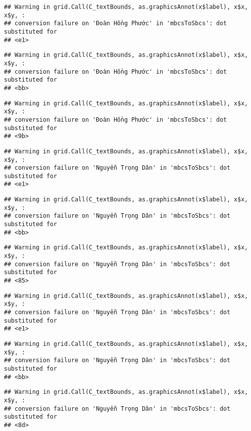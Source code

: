 \documentclass[
]{article}
\begin{document}
\begin{verbatim}
## Warning in grid.Call(C_textBounds, as.graphicsAnnot(x$label), x$x, x$y, :
## conversion failure on 'Đoàn Hồng Phước' in 'mbcsToSbcs': dot substituted for
## <e1>
\end{verbatim}

\begin{verbatim}
## Warning in grid.Call(C_textBounds, as.graphicsAnnot(x$label), x$x, x$y, :
## conversion failure on 'Đoàn Hồng Phước' in 'mbcsToSbcs': dot substituted for
## <bb>
\end{verbatim}

\begin{verbatim}
## Warning in grid.Call(C_textBounds, as.graphicsAnnot(x$label), x$x, x$y, :
## conversion failure on 'Đoàn Hồng Phước' in 'mbcsToSbcs': dot substituted for
## <9b>
\end{verbatim}

\begin{verbatim}
## Warning in grid.Call(C_textBounds, as.graphicsAnnot(x$label), x$x, x$y, :
## conversion failure on 'Nguyễn Trọng Dân' in 'mbcsToSbcs': dot substituted for
## <e1>
\end{verbatim}

\begin{verbatim}
## Warning in grid.Call(C_textBounds, as.graphicsAnnot(x$label), x$x, x$y, :
## conversion failure on 'Nguyễn Trọng Dân' in 'mbcsToSbcs': dot substituted for
## <bb>
\end{verbatim}

\begin{verbatim}
## Warning in grid.Call(C_textBounds, as.graphicsAnnot(x$label), x$x, x$y, :
## conversion failure on 'Nguyễn Trọng Dân' in 'mbcsToSbcs': dot substituted for
## <85>
\end{verbatim}

\begin{verbatim}
## Warning in grid.Call(C_textBounds, as.graphicsAnnot(x$label), x$x, x$y, :
## conversion failure on 'Nguyễn Trọng Dân' in 'mbcsToSbcs': dot substituted for
## <e1>
\end{verbatim}

\begin{verbatim}
## Warning in grid.Call(C_textBounds, as.graphicsAnnot(x$label), x$x, x$y, :
## conversion failure on 'Nguyễn Trọng Dân' in 'mbcsToSbcs': dot substituted for
## <bb>
\end{verbatim}

\begin{verbatim}
## Warning in grid.Call(C_textBounds, as.graphicsAnnot(x$label), x$x, x$y, :
## conversion failure on 'Nguyễn Trọng Dân' in 'mbcsToSbcs': dot substituted for
## <8d>
\end{verbatim}
\end{document}
